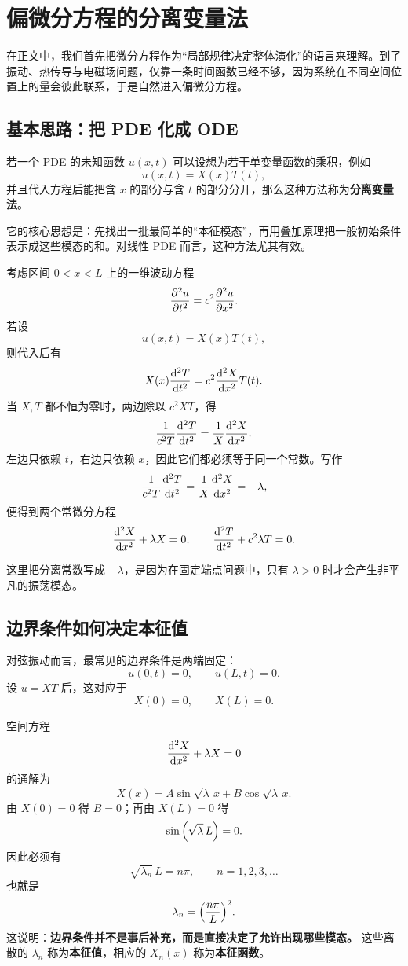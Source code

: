 \section{偏微分方程的分离变量法}

在正文中，我们首先把微分方程作为“局部规律决定整体演化”的语言来理解。到了振动、热传导与电磁场问题，仅靠一条时间函数已经不够，因为系统在不同空间位置上的量会彼此联系，于是自然进入偏微分方程。

\subsection{基本思路：把 PDE 化成 ODE}

\begin{definition}
若一个 PDE 的未知函数 $u(x,t)$ 可以设想为若干单变量函数的乘积，例如
\[
  u(x,t)=X(x)T(t),
\]
并且代入方程后能把含 $x$ 的部分与含 $t$ 的部分分开，那么这种方法称为\textbf{分离变量法}。
\end{definition}

它的核心思想是：先找出一批最简单的“本征模态”，再用叠加原理把一般初始条件表示成这些模态的和。对线性 PDE 而言，这种方法尤其有效。

\begin{theorem}[一维波动方程的分离]
考虑区间 $0<x<L$ 上的一维波动方程
\[
  \pdv[2]{u}{t}=c^2\pdv[2]{u}{x}.
\]
若设
\[
  u(x,t)=X(x)T(t),
\]
则代入后有
\[
  X(x)\dv[2]{T}{t}=c^2\dv[2]{X}{x}T(t).
\]
当 $X,T$ 都不恒为零时，两边除以 $c^2XT$，得
\[
  \frac{1}{c^2T}\dv[2]{T}{t}=\frac{1}{X}\dv[2]{X}{x}.
\]
左边只依赖 $t$，右边只依赖 $x$，因此它们都必须等于同一个常数。写作
\[
  \frac{1}{c^2T}\dv[2]{T}{t}=\frac{1}{X}\dv[2]{X}{x}=-\lambda,
\]
便得到两个常微分方程
\[
  \dv[2]{X}{x}+\lambda X=0,
  \qquad
  \dv[2]{T}{t}+c^2\lambda T=0.
\]
\end{theorem}

这里把分离常数写成 $-\lambda$，是因为在固定端点问题中，只有 $\lambda>0$ 时才会产生非平凡的振荡模态。

\subsection{边界条件如何决定本征值}

对弦振动而言，最常见的边界条件是两端固定：
\[
  u(0,t)=0,
  \qquad
  u(L,t)=0.
\]
设 $u=X T$ 后，这对应于
\[
  X(0)=0,
  \qquad
  X(L)=0.
\]

空间方程
\[
  \dv[2]{X}{x}+\lambda X=0
\]
的通解为
\[
  X(x)=A\sin \sqrt{\lambda}\,x + B\cos \sqrt{\lambda}\,x.
\]
由 $X(0)=0$ 得 $B=0$；再由 $X(L)=0$ 得
\[
  \sin\qty(\sqrt{\lambda}\,L)=0.
\]
因此必须有
\[
  \sqrt{\lambda_n}\,L=n\pi,
  \qquad n=1,2,3,\dots
\]
也就是
\[
  \lambda_n=\qty(\frac{n\pi}{L})^2.
\]
这说明：\textbf{边界条件并不是事后补充，而是直接决定了允许出现哪些模态。} 这些离散的 $\lambda_n$ 称为\textbf{本征值}，相应的 $X_n(x)$ 称为\textbf{本征函数}。

